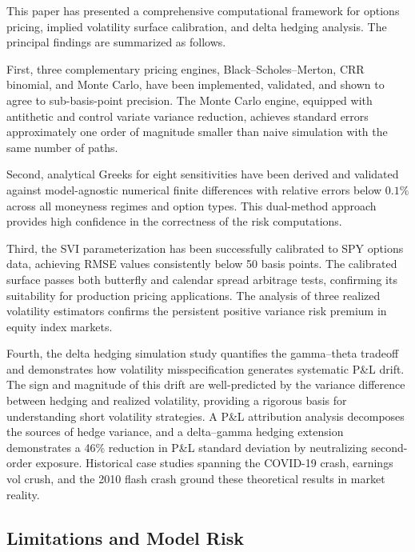 \documentclass[11pt,a4paper]{article}
\begin{document}
This paper has presented a comprehensive computational framework for options pricing, implied volatility surface calibration, and delta hedging analysis. The principal findings are summarized as follows.

First, three complementary pricing engines, Black--Scholes--Merton, CRR binomial, and Monte Carlo, have been implemented, validated, and shown to agree to sub-basis-point precision. The Monte Carlo engine, equipped with antithetic and control variate variance reduction, achieves standard errors approximately one order of magnitude smaller than naive simulation with the same number of paths.

Second, analytical Greeks for eight sensitivities have been derived and validated against model-agnostic numerical finite differences with relative errors below $0.1\%$ across all moneyness regimes and option types. This dual-method approach provides high confidence in the correctness of the risk computations.

Third, the SVI parameterization has been successfully calibrated to SPY options data, achieving RMSE values consistently below 50 basis points. The calibrated surface passes both butterfly and calendar spread arbitrage tests, confirming its suitability for production pricing applications. The analysis of three realized volatility estimators confirms the persistent positive variance risk premium in equity index markets.

Fourth, the delta hedging simulation study quantifies the gamma--theta tradeoff and demonstrates how volatility misspecification generates systematic P\&L drift. The sign and magnitude of this drift are well-predicted by the variance difference between hedging and realized volatility, providing a rigorous basis for understanding short volatility strategies. A P\&L attribution analysis decomposes the sources of hedge variance, and a delta--gamma hedging extension demonstrates a 46\% reduction in P\&L standard deviation by neutralizing second-order exposure. Historical case studies spanning the COVID-19 crash, earnings vol crush, and the 2010 flash crash ground these theoretical results in market reality.

\subsection{Limitations and Model Risk}
\end{document}

